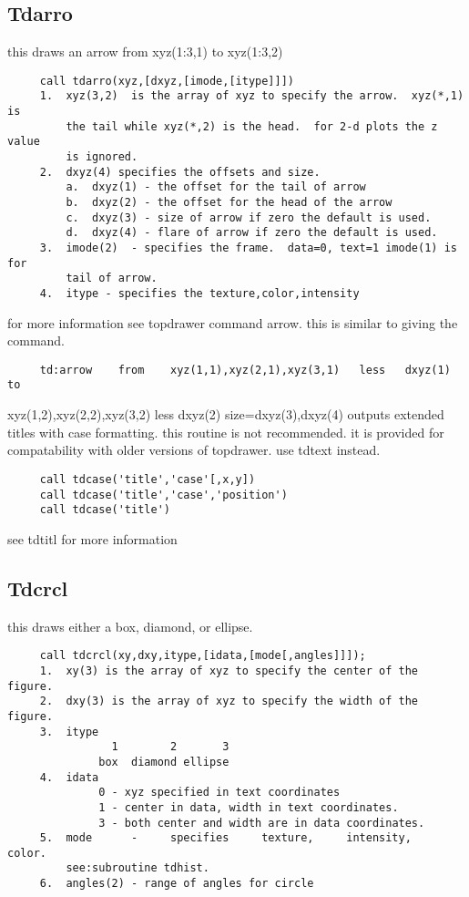 \subsection{Tdarro}
this draws an arrow from xyz(1:3,1) to xyz(1:3,2) 
\begin{verbatim}
     call tdarro(xyz,[dxyz,[imode,[itype]]]) 
     1.  xyz(3,2)  is the array of xyz to specify the arrow.  xyz(*,1) is
         the tail while xyz(*,2) is the head.  for 2-d plots the z  value
         is ignored.  
     2.  dxyz(4) specifies the offsets and size.  
         a.  dxyz(1) - the offset for the tail of arrow 
         b.  dxyz(2) - the offset for the head of the arrow 
         c.  dxyz(3) - size of arrow if zero the default is used.  
         d.  dxyz(4) - flare of arrow if zero the default is used.  
     3.  imode(2)  - specifies the frame.  data=0, text=1 imode(1) is for
         tail of arrow.  
     4.  itype - specifies the texture,color,intensity 
\end{verbatim}
for  more  information  see  topdrawer command arrow.  this is similar to
giving the command.  
\begin{verbatim}
     td:arrow    from    xyz(1,1),xyz(2,1),xyz(3,1)   less   dxyz(1)   to
\end{verbatim}
xyz(1,2),xyz(2,2),xyz(3,2)  less  dxyz(2)  size=dxyz(3),dxyz(4)   outputs
extended titles with case formatting.  
this  routine  is not recommended.  it is provided for compatability with
older versions of topdrawer.  use tdtext instead.  
\begin{verbatim}
     call tdcase('title','case'[,x,y]) 
     call tdcase('title','case','position') 
     call tdcase('title') 
\end{verbatim}

see tdtitl for more information 
\subsection{Tdcrcl}
this draws either a box, diamond, or ellipse.  
\begin{verbatim}
     call tdcrcl(xy,dxy,itype,[idata,[mode[,angles]]]);  
     1.  xy(3) is the array of xyz to specify the center of the figure.  
     2.  dxy(3) is the array of xyz to specify the width of the figure.  
     3.  itype 
                1        2       3
              box  diamond ellipse
     4.  idata 
              0 - xyz specified in text coordinates 
              1 - center in data, width in text coordinates.  
              3 - both center and width are in data coordinates.  
     5.  mode      -     specifies     texture,     intensity,     color.
         see:subroutine tdhist.  
     6.  angles(2) - range of angles for circle 
\end{verbatim}

